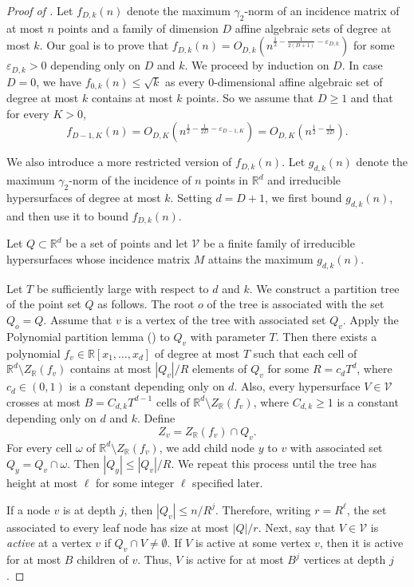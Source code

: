 \documentclass[10pt,a4paper]{amsart}
\newcommand{\eps}{\varepsilon}
\begin{document}
\begin{proof}[Proof of ]
		Let $f_{D,k}(n)$ denote the maximum $\gamma_2$-norm of an incidence matrix of at most $n$ points and a family of dimension $D$ affine algebraic sets of degree at most $k$. Our goal is to prove that $f_{D,k}(n)=O_{D,k}(n^{\frac{1}{2}-\frac{1}{2(D+1)}-\eps_{D,k}})$ for some $\eps_{D,k}>0$ depending only on $D$ and $k$. We proceed by induction on $D$. In case $D=0$, we have $f_{0,k}(n)\leq \sqrt{k}$ as every 0-dimensional affine algebraic set of degree at most $k$ contains at most $k$ points. So we assume that $D\geq 1$ and that for every $K>0$, $$f_{D-1,K}(n)=O_{D,K}(n^{\frac{1}{2}-\frac{1}{2D}-\eps_{D-1,K}})=O_{D,K}(n^{\frac{1}{2}-\frac{1}{2D}}).$$
		
		We also introduce a more restricted version of $f_{D,k}(n)$. Let $g_{d,k}(n)$ denote the maximum $\gamma_2$-norm of the incidence of $n$ points in $\mathbb{R}^d$ and irreducible hypersurfaces of degree at most $k$. Setting $d=D+1$, we first bound $g_{d,k}(n)$, and then use it to bound $f_{D,k}(n)$.
		
		
		Let $Q\subset \mathbb{R}^d$ be a set of points and let $\mathcal{V}$ be a finite family of irreducible hypersurfaces whose incidence matrix $M$ attains the maximum $g_{d,k}(n)$. 
		
		Let $T$ be sufficiently large with respect to $d$ and $k$. We construct a partition tree of the point set $Q$ as follows. The root $o$ of the tree is associated with the set $Q_{o}=Q$. Assume that $v$ is a vertex of the tree with associated set $Q_v$. Apply the Polynomial partition lemma  () to $Q_v$ with parameter $T$. Then there exists a polynomial   $f_v\in \mathbb{R}[x_1,\dots,x_d]$ of degree at most $T$ such that each cell of $\mathbb{R}^d\setminus Z_{\mathbb{R}}(f_v)$ contains at most $|Q_v|/R$ elements of $Q_v$ for some $R=c_dT^d$, where $c_d\in (0,1)$ is a constant depending only on $d$. Also, every hypersurface $V\in \mathcal{V}$ crosses at most $B=C_{d,k}T^{d-1}$ cells of $\mathbb{R}^d\setminus Z_{\mathbb{R}}(f_v)$, where $C_{d,k}\geq 1$ is a constant depending only on $d$ and $k$. Define
		$$Z_v=Z_{\mathbb{R}}(f_v)\cap Q_v.$$
		For every cell $\omega$ of $\mathbb{R}^d\setminus Z_{\mathbb{R}}(f_v)$, we add child node $y$ to $v$ with associated set $Q_y=Q_v\cap \omega$. Then $|Q_y|\leq |Q_v|/R$. We repeat this process until the tree has height at most $\ell$ for some integer $\ell$ specified later.
		
		If a node $v$ is at depth $j$, then $|Q_v|\leq n/R^j$. Therefore, writing $r=R^{\ell}$, the set associated to every leaf node has size at most $|Q|/r$. Next, say that $V\in \mathcal{V}$ is \emph{active} at a vertex $v$ if $Q_v\cap V\neq \emptyset$. If $V$ is active at some vertex $v$, then it is active for at most $B$ children of $v$. Thus, $V$ is active for at most $B^j$ vertices at depth $j$.


\end{proof}
\end{document}
